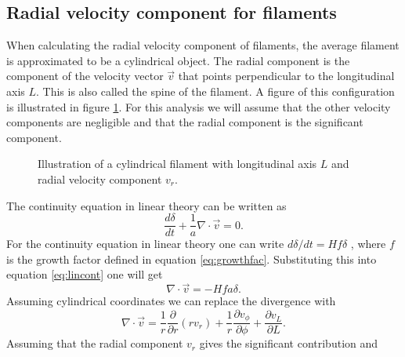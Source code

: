 \subsection{Radial velocity component for filaments}\label{sec:filamentvr}
When calculating the radial velocity component of filaments, the average filament is
approximated to be a cylindrical object. The radial component is the component of
the velocity vector $\vec{v}$ that points perpendicular to the longitudinal axis
$L$. This is also called the spine of the filament. A figure of this configuration is illustrated in figure \ref{fig:filamentvr}. For this analysis we
will assume that the other velocity components are negligible and that the
radial component is the significant component.
\begin{figure}
    \begin{center}
    \end{center}
    \caption{Illustration of a cylindrical filament with longitudinal axis $L$ and radial velocity component $v_r$.}
    \label{fig:filamentvr}
\end{figure}
The continuity equation in linear theory can be written as
\begin{equation}\label{eq:lincont}
    \frac{d\delta}{dt}+\frac{1}{a}\nabla\cdot\vec{v}=0.
\end{equation}
For the continuity equation in linear theory one can write
 $d\delta/dt=Hf\delta$ \cite[p.~347]{schneider2006extragalactic}, where $f$ is the growth factor
defined in equation \ref{eq:growthfac}. Substituting this into equation
\ref{eq:lincont} one will get
\begin{equation}\label{eq:templineq}
    \nabla\cdot\vec{v}=-Hfa\delta.
\end{equation}
Assuming cylindrical coordinates we can replace the
divergence with
\begin{equation}
    \nabla\cdot\vec{v}=\frac{1}{r}\frac{\partial}{\partial r}(rv_r)+\frac{1}{r}\frac{\partial v_\phi}{\partial \phi} +\frac{\partial v_L}{\partial L}.
\end{equation}
Assuming that the radial component $v_r$ gives the significant contribution and
